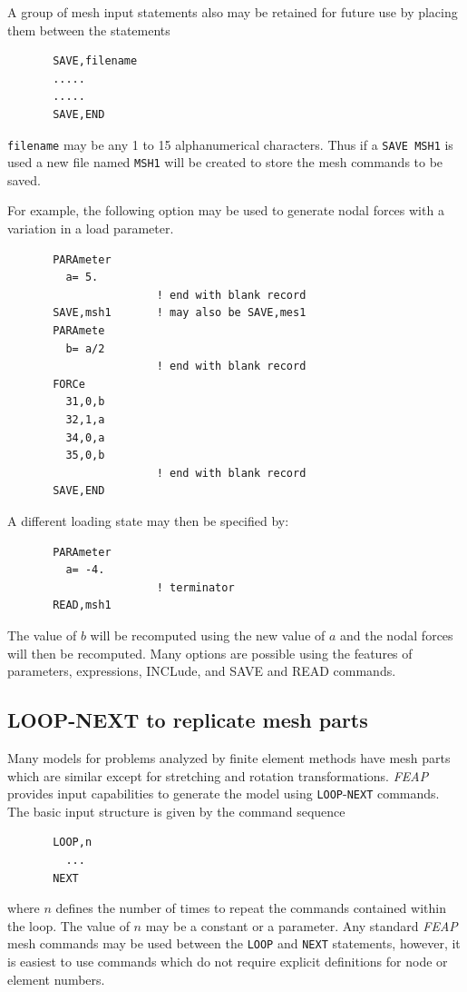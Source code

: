 A group of mesh input statements also may be retained for future use by
placing them between the statements
\begin{verbatim}
       SAVE,filename
       .....
       .....
       SAVE,END
\end{verbatim}
{\tt filename} may be any 1 to 15 alphanumerical characters. Thus if
a {\tt SAVE MSH1} is used a new file named {\tt MSH1} will be
created to store the mesh commands to be saved.

For example, the following option may be used to generate nodal
forces with a variation in a load parameter.
\begin{verbatim}
       PARAmeter
         a= 5.
                       ! end with blank record
       SAVE,msh1       ! may also be SAVE,mes1
       PARAmete
         b= a/2
                       ! end with blank record
       FORCe
         31,0,b
         32,1,a
         34,0,a
         35,0,b
                       ! end with blank record
       SAVE,END
\end{verbatim}
A different loading state may then be specified by:
\begin{verbatim}
       PARAmeter
         a= -4.
                       ! terminator
       READ,msh1
\end{verbatim}
The value of $b$ will be recomputed using the new value of $a$
and the nodal forces will then be recomputed.  Many options are
possible using the features of parameters, expressions, INCLude, and SAVE
and READ commands.


\subsection{LOOP-NEXT to replicate mesh parts}
\label{mloop}

Many models for problems analyzed by finite element methods have mesh parts
which are similar except for stretching and rotation transformations.
\textsl{FEAP} provides input capabilities to generate the model using
\texttt{LOOP}-\texttt{NEXT} commands.  The basic input structure is given
by the command sequence
\begin{verbatim}
       LOOP,n
         ...
       NEXT
\end{verbatim}
where $n$ defines the number of times to repeat the commands contained
within the loop.  The value of $n$ may be a constant or a parameter.
Any standard \textsl{FEAP} mesh commands may be used between the \texttt{LOOP}
and \texttt{NEXT} statements, however, it is easiest to use commands which do
not require explicit definitions for node or element numbers.

